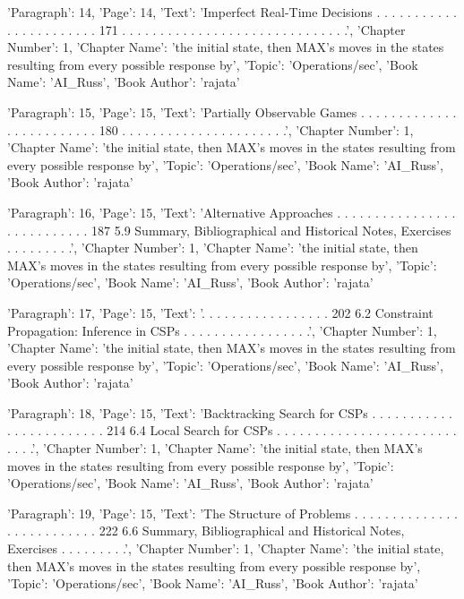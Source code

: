 {'Paragraph': 14, 'Page': 14, 'Text': 'Imperfect Real-Time Decisions . . . . . . . . . . . . . . . . . . . . . . . 171 . . . . . . . . . . . . . . . . . . . . . . . . . . . . . .', 'Chapter Number': 1, 'Chapter Name': 'the initial state, then MAX’s moves in the states resulting from every possible response by', 'Topic': 'Operations/sec', 'Book Name': 'AI_Russ', 'Book Author': 'rajata'}

{'Paragraph': 15, 'Page': 15, 'Text': 'Partially Observable Games . . . . . . . . . . . . . . . . . . . . . . . . . 180 . . . . . . . . . . . . . . . . . . . . . .', 'Chapter Number': 1, 'Chapter Name': 'the initial state, then MAX’s moves in the states resulting from every possible response by', 'Topic': 'Operations/sec', 'Book Name': 'AI_Russ', 'Book Author': 'rajata'}

{'Paragraph': 16, 'Page': 15, 'Text': 'Alternative Approaches . . . . . . . . . . . . . . . . . . . . . . . . . . . 187 5.9 Summary, Bibliographical and Historical Notes, Exercises . . . . . . . . .', 'Chapter Number': 1, 'Chapter Name': 'the initial state, then MAX’s moves in the states resulting from every possible response by', 'Topic': 'Operations/sec', 'Book Name': 'AI_Russ', 'Book Author': 'rajata'}

{'Paragraph': 17, 'Page': 15, 'Text': '. . . . . . . . . . . . . . . . . 202 6.2 Constraint Propagation: Inference in CSPs . . . . . . . . . . . . . . . . .', 'Chapter Number': 1, 'Chapter Name': 'the initial state, then MAX’s moves in the states resulting from every possible response by', 'Topic': 'Operations/sec', 'Book Name': 'AI_Russ', 'Book Author': 'rajata'}

{'Paragraph': 18, 'Page': 15, 'Text': 'Backtracking Search for CSPs . . . . . . . . . . . . . . . . . . . . . . . . 214 6.4 Local Search for CSPs . . . . . . . . . . . . . . . . . . . . . . . . . . . .', 'Chapter Number': 1, 'Chapter Name': 'the initial state, then MAX’s moves in the states resulting from every possible response by', 'Topic': 'Operations/sec', 'Book Name': 'AI_Russ', 'Book Author': 'rajata'}

{'Paragraph': 19, 'Page': 15, 'Text': 'The Structure of Problems . . . . . . . . . . . . . . . . . . . . . . . . . . 222 6.6 Summary, Bibliographical and Historical Notes, Exercises . . . . . . . . .', 'Chapter Number': 1, 'Chapter Name': 'the initial state, then MAX’s moves in the states resulting from every possible response by', 'Topic': 'Operations/sec', 'Book Name': 'AI_Russ', 'Book Author': 'rajata'}

